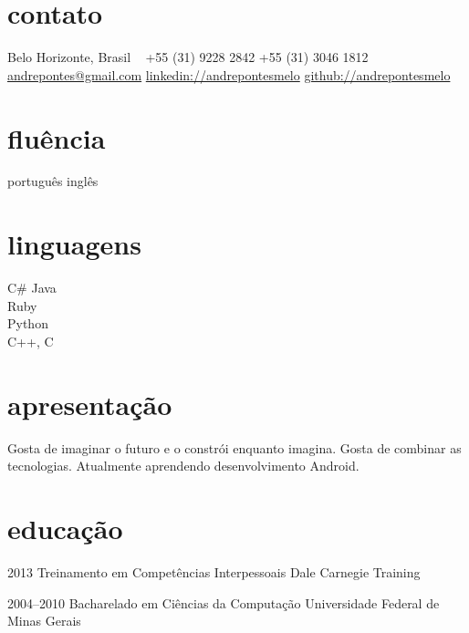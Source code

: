 \documentclass[]{friggeri-cv}
\begin{document}


\begin{aside} %
\section{contato}
Belo Horizonte, Brasil
~
+55 (31) 9228 2842
+55 (31) 3046 1812
~
\href{mailto:andrepontes@gmail.com}{andrepontes@gmail.com}
\href{https://br.linkedin.com/in/andrepontesmelo}{linkedin://andrepontesmelo}
\href{https://github.com/andrepontesmelo}{github://andrepontesmelo}
\section{fluência}
português
inglês 
\section{linguagens}
C\#
Java\\Ruby\\Python\\C++, C
\end{aside}

\section{apresentação}
Gosta de imaginar o futuro e o constrói enquanto imagina. Gosta de combinar as tecnologias. 
Atualmente aprendendo desenvolvimento Android.

\section{educação}

\begin{entrylist}


\entry
{2013}
{{\normalfont Treinamento em} Competências Interpessoais}
{Dale Carnegie Training}

\entry
{2004--2010}
{{\normalfont Bacharelado em} Ciências da Computação}
{Universidade Federal de Minas Gerais}



\end{entrylist}
\end{document}
